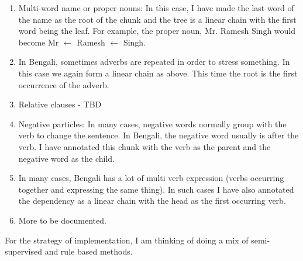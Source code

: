 \documentclass[11pt,letterpaper]{article}
\begin{document}
\begin{enumerate}
\item Multi-word name or proper nouns: In this case, I have made the last word of the name as the root of the chunk and the tree is a linear chain with the first word being the leaf. For example, the proper noun, Mr. Ramesh Singh would become Mr $\leftarrow$ Ramesh $\leftarrow$ Singh.
\item In Bengali, sometimes adverbs are repeated in order to stress something. In this case we again form a linear chain as above. This time the root is the first occurrence of the adverb.
\item Relative clauses - TBD
\item Negative particles: In many cases, negative words normally group with the verb to change the sentence. In Bengali, the negative word usually is after the verb. I have annotated this chunk with the verb as the parent and the negative word as the child.
\item In many cases, Bengali has a lot of multi verb expression (verbs occurring together and expressing the same thing). In such cases I have also annotated the dependency as a linear chain with the head as the first occurring verb.
\item More to be documented.
\end{enumerate}

For the strategy of implementation, I am thinking of doing a  mix of semi-supervised and rule based methods.


 

\newpage




\label{lastpage}
\end{document}
